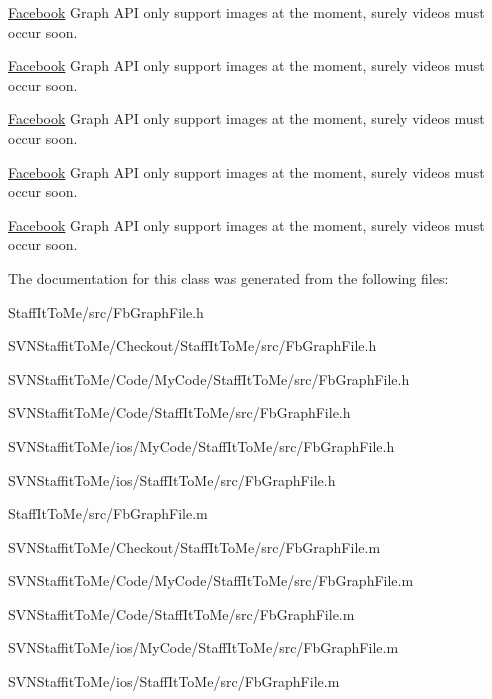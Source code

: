 \hyperlink{interface_facebook}{\-Facebook} \-Graph \-A\-P\-I only support images at the moment, surely videos must occur soon.

\hyperlink{interface_facebook}{\-Facebook} \-Graph \-A\-P\-I only support images at the moment, surely videos must occur soon.

\hyperlink{interface_facebook}{\-Facebook} \-Graph \-A\-P\-I only support images at the moment, surely videos must occur soon.

\hyperlink{interface_facebook}{\-Facebook} \-Graph \-A\-P\-I only support images at the moment, surely videos must occur soon.

\hyperlink{interface_facebook}{\-Facebook} \-Graph \-A\-P\-I only support images at the moment, surely videos must occur soon.

\-The documentation for this class was generated from the following files\-:\begin{DoxyCompactItemize}
\item 
\-Staff\-It\-To\-Me/src/\-Fb\-Graph\-File.\-h\item 
\-S\-V\-N\-Staffit\-To\-Me/\-Checkout/\-Staff\-It\-To\-Me/src/\-Fb\-Graph\-File.\-h\item 
\-S\-V\-N\-Staffit\-To\-Me/\-Code/\-My\-Code/\-Staff\-It\-To\-Me/src/\-Fb\-Graph\-File.\-h\item 
\-S\-V\-N\-Staffit\-To\-Me/\-Code/\-Staff\-It\-To\-Me/src/\-Fb\-Graph\-File.\-h\item 
\-S\-V\-N\-Staffit\-To\-Me/ios/\-My\-Code/\-Staff\-It\-To\-Me/src/\-Fb\-Graph\-File.\-h\item 
\-S\-V\-N\-Staffit\-To\-Me/ios/\-Staff\-It\-To\-Me/src/\-Fb\-Graph\-File.\-h\item 
\-Staff\-It\-To\-Me/src/\-Fb\-Graph\-File.\-m\item 
\-S\-V\-N\-Staffit\-To\-Me/\-Checkout/\-Staff\-It\-To\-Me/src/\-Fb\-Graph\-File.\-m\item 
\-S\-V\-N\-Staffit\-To\-Me/\-Code/\-My\-Code/\-Staff\-It\-To\-Me/src/\-Fb\-Graph\-File.\-m\item 
\-S\-V\-N\-Staffit\-To\-Me/\-Code/\-Staff\-It\-To\-Me/src/\-Fb\-Graph\-File.\-m\item 
\-S\-V\-N\-Staffit\-To\-Me/ios/\-My\-Code/\-Staff\-It\-To\-Me/src/\-Fb\-Graph\-File.\-m\item 
\-S\-V\-N\-Staffit\-To\-Me/ios/\-Staff\-It\-To\-Me/src/\-Fb\-Graph\-File.\-m\end{DoxyCompactItemize}
